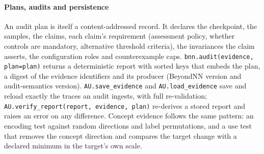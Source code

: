 \paragraph*{Plans, audits and persistence}
An audit plan is itself a content-addressed record. It declares the checkpoint, the samples, the claims, each claim's requirement (assessment policy, whether controls are mandatory, alternative threshold criteria), the invariances the claim asserts, the configuration roles and counterexample caps. \texttt{bnn.audit(evidence, plan=plan)} returns a deterministic report with sorted keys that embeds the plan, a digest of the evidence identifiers and its producer (BeyondNN version and audit-semantics version). \texttt{AU.save\_evidence} and \texttt{AU.load\_evidence} save and reload exactly the traces an audit ingests, with full re-validation; \texttt{AU.verify\_report(report, evidence, plan)} re-derives a stored report and raises an error on any difference. Concept evidence follows the same pattern: an encoding test against random directions and label permutations, and a use test that removes the concept direction and compares the target change with a declared minimum in the target's own scale.
